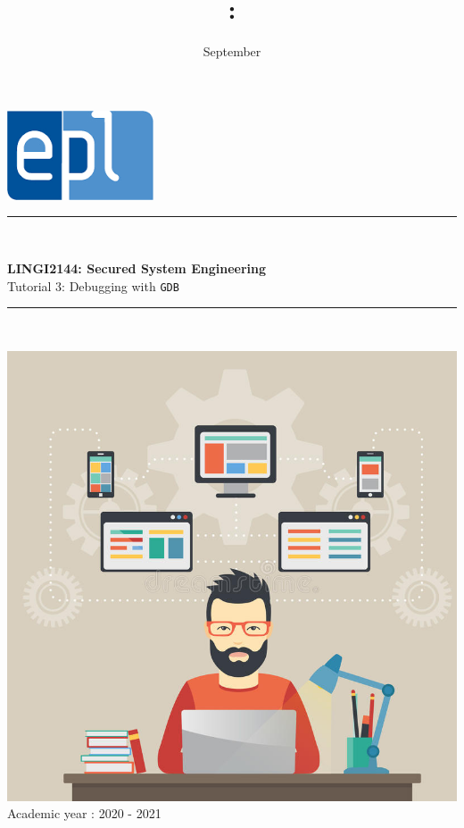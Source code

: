 \documentclass{article}
\title{\codecourse : \titlecourse}
\author{\othor}
\date{September \year}
\newcommand{\codecourse}{LINGI2144}
\newcommand{\titlecourse}{Secured System Engineering}
\newcommand{\ayear}{2020 - 2021}
\begin{document}
        \hfill\includegraphics[scale=0.5]{image/logoepl.png}
        
        \vspace*{\fill}
            
        \begin{center}
        
            \rule{1\textwidth}{1pt}\\
	            \vspace{0.5\baselineskip}
		            \begin{LARGE}
	                	\textbf{\codecourse : \titlecourse}\\
	                	Tutorial 3: Debugging with \lstinline{GDB}
		            \end{LARGE}
		        \vspace{0.5\baselineskip}       
	        \rule{1\textwidth}{1pt}\\
	        
	        \vspace{0.5\baselineskip}
	        
	        \includegraphics[scale=1.5]{image/MCP.jpg}\\

	        \vspace{0.5\baselineskip}
	            Academic year : \ayear\\
                
		\end{center}
		
\end{document}
